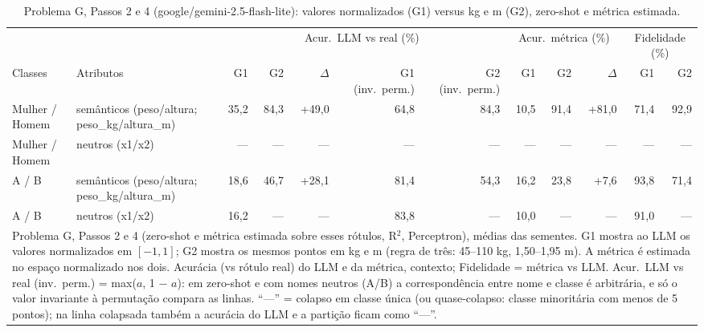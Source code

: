 \begin{table}[htbp]
\centering
\footnotesize
\caption{Problema G, Passos 2 e 4 (google/gemini-2.5-flash-lite): valores normalizados (G1) versus kg e m (G2), zero-shot e métrica estimada.}
\label{tab:bloco3_G1_vs_G2_passos_2_e_4_flashlite}
\begin{tabular}{llrrrrrrrrrr}
\toprule
 &  & \multicolumn{5}{c}{Acur.\ LLM vs real (\%)} & \multicolumn{3}{c}{Acur.\ métrica (\%)} & \multicolumn{2}{c}{Fidelidade (\%)} \\ \cmidrule(lr){3-7} \cmidrule(lr){8-10} \cmidrule(lr){11-12}
Classes & Atributos & G1 & G2 & $\Delta$ & G1 (inv.\ perm.) & G2 (inv.\ perm.) & G1 & G2 & $\Delta$ & G1 & G2 \\
\midrule
Mulher / Homem & semânticos (peso/altura; peso\_kg/altura\_m) & 35,2 & 84,3 & +49,0 & 64,8 & 84,3 & 10,5 & 91,4 & +81,0 & 71,4 & 92,9 \\
Mulher / Homem & neutros (x1/x2) & — & — & — & — & — & — & — & — & — & — \\
A / B & semânticos (peso/altura; peso\_kg/altura\_m) & 18,6 & 46,7 & +28,1 & 81,4 & 54,3 & 16,2 & 23,8 & +7,6 & 93,8 & 71,4 \\
A / B & neutros (x1/x2) & 16,2 & — & — & 83,8 & — & 10,0 & — & — & 91,0 & — \\
\bottomrule
\multicolumn{12}{p{0.95\linewidth}}{\footnotesize Problema G, Passos 2 e 4 (zero-shot e métrica estimada sobre esses rótulos, R$^2$, Perceptron), médias das sementes. G1 mostra ao LLM os valores normalizados em $[-1, 1]$; G2 mostra os mesmos pontos em kg e m (regra de três: 45–110 kg, 1,50–1,95 m). A métrica é estimada no espaço normalizado nos dois. Acurácia (vs rótulo real) do LLM e da métrica, contexto; Fidelidade = métrica vs LLM. Acur.\ LLM vs real (inv.\ perm.) = max($a$, 1 $-$ $a$): em zero-shot e com nomes neutros (A/B) a correspondência entre nome e classe é arbitrária, e só o valor invariante à permutação compara as linhas. ``—'' = colapso em classe única (ou quase-colapso: classe minoritária com menos de 5 pontos); na linha colapsada também a acurácia do LLM e a partição ficam como ``—''.} \\
\end{tabular}
\end{table}
